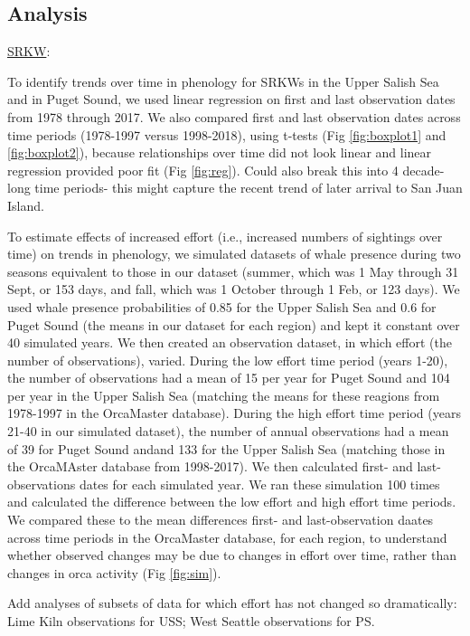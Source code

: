 \documentclass{article}
\begin{document}
\subsection* {Analysis}
\underline{SRKW}:
\par To identify trends over time in phenology for SRKWs in the Upper Salish Sea and in Puget Sound, we used linear regression on first  and last observation dates from 1978 through 2017. We also compared first and last observation dates across time periods (1978-1997 versus 1998-2018), using t-tests (Fig \ref{fig:boxplot1} and \ref{fig:boxplot2}), because relationships over time did not look linear and linear regression provided poor fit (Fig \ref{fig:reg}). Could also break this into 4 decade-long time periods- this might capture the recent trend of later arrival to San Juan Island. 
\par  To estimate effects of increased effort (i.e., increased numbers of sightings over time) on trends in phenology, we simulated datasets of whale presence during two seasons equivalent to those in our dataset (summer, which was 1 May through 31 Sept, or 153 days, and fall, which was 1 October through 1 Feb, or 123 days). We used whale presence probabilities of 0.85 for the Upper Salish Sea and 0.6 for Puget Sound (the means in our dataset for each region) and kept it constant over 40 simulated years. We then created an observation dataset, in which effort (the number of observations), varied. During the low effort time period (years 1-20), the number of observations had a mean of 15 per year for Puget Sound and 104 per year in the Upper Salish Sea (matching the means for these reagions from 1978-1997 in the OrcaMaster database).  During the high effort time period (years 21-40 in our simulated dataset), the number of annual observations had a mean of 39 for Puget Sound andand 133 for the Upper Salish Sea (matching those in the OrcaMAster database from 1998-2017). We then calculated first- and last- observations dates for each simulated year. We ran these simulation 100 times and calculated the difference between the low effort and high effort time periods. We compared these to the mean differences first- and last-observation daates across time periods in the OrcaMaster database, for each region, to understand whether observed changes may be due to changes in effort over time, rather than changes in orca activity (Fig \ref{fig:sim}).
\par Add analyses of subsets of data for which effort has not changed so dramatically: Lime Kiln observations for USS; West Seattle observations for PS.
\end{document}
